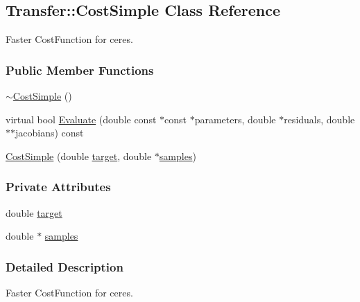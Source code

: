 \hypertarget{classTransfer_1_1CostSimple}{\subsection{\-Transfer\-:\-:\-Cost\-Simple \-Class \-Reference}
\label{classTransfer_1_1CostSimple}
}


\-Faster \-Cost\-Function for ceres.  


\subsubsection*{\-Public \-Member \-Functions}
\begin{DoxyCompactItemize}
\item 
\hyperlink{classTransfer_1_1CostSimple_a8a6438e0f96d6f365583b6fc8196ce39}{$\sim$\-Cost\-Simple} ()
\item 
virtual bool \hyperlink{classTransfer_1_1CostSimple_ad7549346e1f495abef2fe1f579a0ecb1}{\-Evaluate} (double const $\ast$const $\ast$parameters, double $\ast$residuals, double $\ast$$\ast$jacobians) const 
\item 
\hyperlink{classTransfer_1_1CostSimple_a4ccde037fcf106c1d496b2ddf1e2c539}{\-Cost\-Simple} (double \hyperlink{classTransfer_1_1CostSimple_a84efcbdc62b0f4ec4ac2930b73bfadbd}{target}, double $\ast$\hyperlink{classTransfer_1_1CostSimple_a605527eec7e3a8c78714eea5bbc48569}{samples})
\end{DoxyCompactItemize}
\subsubsection*{\-Private \-Attributes}
\begin{DoxyCompactItemize}
\item 
double \hyperlink{classTransfer_1_1CostSimple_a84efcbdc62b0f4ec4ac2930b73bfadbd}{target}
\item 
double $\ast$ \hyperlink{classTransfer_1_1CostSimple_a605527eec7e3a8c78714eea5bbc48569}{samples}
\end{DoxyCompactItemize}


\subsubsection{\-Detailed \-Description}
\-Faster \-Cost\-Function for ceres. 

